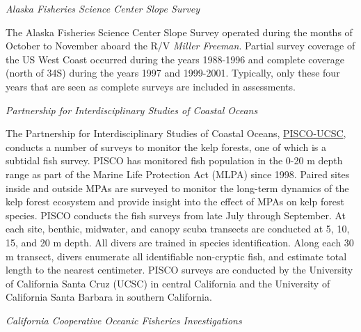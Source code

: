 \documentclass[11pt,
  english,
  a4paper,
]{article}
\begin{document}
\emph{Alaska Fisheries Science Center Slope Survey}

The Alaska Fisheries Science Center Slope Survey operated during the months of October to November aboard the R/V \emph{Miller Freeman}. Partial survey coverage of the US West Coast occurred during the years 1988-1996 and complete coverage (north of 34\textquotesingle S) during the years 1997 and 1999-2001. Typically, only these four years that are seen as complete surveys are included in assessments.

\emph{Partnership for Interdisciplinary Studies of Coastal Oceans}

The Partnership for Interdisciplinary Studies of Coastal Oceans, {\href{http://www.piscoweb.org/kelp-forest-study}{PISCO-UCSC}\leavevmode\tagmcend\tagstructend}, conducts a number of surveys to monitor the kelp forests, one of which is a subtidal fish survey. PISCO has monitored fish population in the 0-20 m depth range as part of the Marine Life Protection Act (MLPA) since 1998. Paired sites inside and outside MPAs are surveyed to monitor the long-term dynamics of the kelp forest ecosystem and provide insight into the effect of MPAs on kelp forest species. PISCO conducts the fish surveys from late July through September. At each site, benthic, midwater, and canopy scuba transects are conducted at 5, 10, 15, and 20 m depth. All divers are trained in species identification. Along each 30 m transect, divers enumerate all identifiable non-cryptic fish, and estimate total length to the nearest centimeter. PISCO surveys are conducted by the University of California Santa Cruz (UCSC) in central California and the University of California Santa Barbara in southern California.

\emph{California Cooperative Oceanic Fisheries Investigations}
\end{document}
